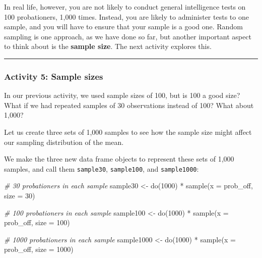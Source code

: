 \documentclass[
]{book}
\newenvironment{Shaded}{\begin{snugshade}}{\end{snugshade}}
\newcommand{\AttributeTok}[1]{\textcolor[rgb]{0.77,0.63,0.00}{#1}}
\newcommand{\CommentTok}[1]{\textcolor[rgb]{0.56,0.35,0.01}{\textit{#1}}}
\newcommand{\DecValTok}[1]{\textcolor[rgb]{0.00,0.00,0.81}{#1}}
\newcommand{\FunctionTok}[1]{\textcolor[rgb]{0.00,0.00,0.00}{#1}}
\newcommand{\NormalTok}[1]{#1}
\newcommand{\OtherTok}[1]{\textcolor[rgb]{0.56,0.35,0.01}{#1}}
\newcommand{\SpecialCharTok}[1]{\textcolor[rgb]{0.00,0.00,0.00}{#1}}
\begin{document}
In real life, however, you are not likely to conduct general intelligence tests on 100 probationers, 1,000 times. Instead, you are likely to administer tests to one sample, and you will have to ensure that your sample is a good one. Random sampling is one approach, as we have done so far, but another important aspect to think about is the \textbf{sample size}. The next activity explores this.

\begin{center}\rule{0.5\linewidth}{0.5pt}\end{center}

\hypertarget{activity-5-sample-sizes}{%
\subsubsection{Activity 5: Sample sizes}\label{activity-5-sample-sizes}}

In our previous activity, we used sample sizes of 100, but is 100 a good size? What if we had repeated samples of 30 observations instead of 100? What about 1,000?

Let us create three sets of 1,000 samples to see how the sample size might affect our sampling distribution of the mean.

We make the three new data frame objects to represent these sets of 1,000 samples, and call them \texttt{sample30}, \texttt{sample100}, and \texttt{sample1000}:

\begin{Shaded}
\begin{Highlighting}[]
\CommentTok{\# 30 probationers in each sample }
\NormalTok{sample30 }\OtherTok{\textless{}{-}} \FunctionTok{do}\NormalTok{(}\DecValTok{1000}\NormalTok{) }\SpecialCharTok{*} \FunctionTok{sample}\NormalTok{(}\AttributeTok{x =}\NormalTok{ prob\_off, }\AttributeTok{size =} \DecValTok{30}\NormalTok{) }

\CommentTok{\# 100 probationers in each sample }
\NormalTok{sample100 }\OtherTok{\textless{}{-}} \FunctionTok{do}\NormalTok{(}\DecValTok{1000}\NormalTok{) }\SpecialCharTok{*} \FunctionTok{sample}\NormalTok{(}\AttributeTok{x =}\NormalTok{ prob\_off, }\AttributeTok{size =} \DecValTok{100}\NormalTok{) }

\CommentTok{\# 1000 probationers in each sample }
\NormalTok{sample1000 }\OtherTok{\textless{}{-}} \FunctionTok{do}\NormalTok{(}\DecValTok{1000}\NormalTok{) }\SpecialCharTok{*} \FunctionTok{sample}\NormalTok{(}\AttributeTok{x =}\NormalTok{ prob\_off, }\AttributeTok{size =} \DecValTok{1000}\NormalTok{) }
\end{Highlighting}
\end{Shaded}
\end{document}
